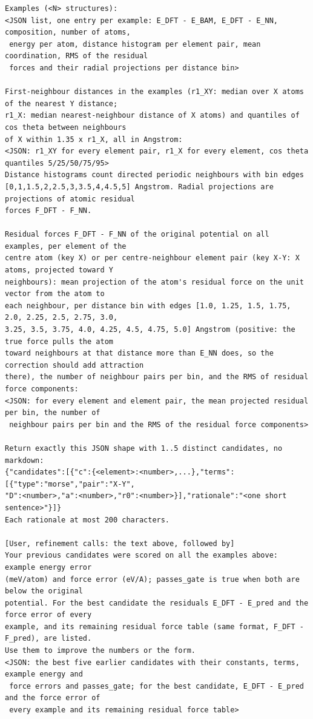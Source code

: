 \begin{scriptsize}
\begin{verbatim}
Examples (<N> structures):
<JSON list, one entry per example: E_DFT - E_BAM, E_DFT - E_NN, composition, number of atoms,
 energy per atom, distance histogram per element pair, mean coordination, RMS of the residual
 forces and their radial projections per distance bin>

First-neighbour distances in the examples (r1_XY: median over X atoms of the nearest Y distance;
r1_X: median nearest-neighbour distance of X atoms) and quantiles of cos theta between neighbours
of X within 1.35 x r1_X, all in Angstrom:
<JSON: r1_XY for every element pair, r1_X for every element, cos theta quantiles 5/25/50/75/95>
Distance histograms count directed periodic neighbours with bin edges
[0,1,1.5,2,2.5,3,3.5,4,4.5,5] Angstrom. Radial projections are projections of atomic residual
forces F_DFT - F_NN.

Residual forces F_DFT - F_NN of the original potential on all examples, per element of the
centre atom (key X) or per centre-neighbour element pair (key X-Y: X atoms, projected toward Y
neighbours): mean projection of the atom's residual force on the unit vector from the atom to
each neighbour, per distance bin with edges [1.0, 1.25, 1.5, 1.75, 2.0, 2.25, 2.5, 2.75, 3.0,
3.25, 3.5, 3.75, 4.0, 4.25, 4.5, 4.75, 5.0] Angstrom (positive: the true force pulls the atom
toward neighbours at that distance more than E_NN does, so the correction should add attraction
there), the number of neighbour pairs per bin, and the RMS of residual force components:
<JSON: for every element and element pair, the mean projected residual per bin, the number of
 neighbour pairs per bin and the RMS of the residual force components>

Return exactly this JSON shape with 1..5 distinct candidates, no markdown:
{"candidates":[{"c":{<element>:<number>,...},"terms":[{"type":"morse","pair":"X-Y",
"D":<number>,"a":<number>,"r0":<number>}],"rationale":"<one short sentence>"}]}
Each rationale at most 200 characters.

[User, refinement calls: the text above, followed by]
Your previous candidates were scored on all the examples above: example energy error
(meV/atom) and force error (eV/A); passes_gate is true when both are below the original
potential. For the best candidate the residuals E_DFT - E_pred and the force error of every
example, and its remaining residual force table (same format, F_DFT - F_pred), are listed.
Use them to improve the numbers or the form.
<JSON: the best five earlier candidates with their constants, terms, example energy and
 force errors and passes_gate; for the best candidate, E_DFT - E_pred and the force error of
 every example and its remaining residual force table>
\end{verbatim}
\end{scriptsize}

